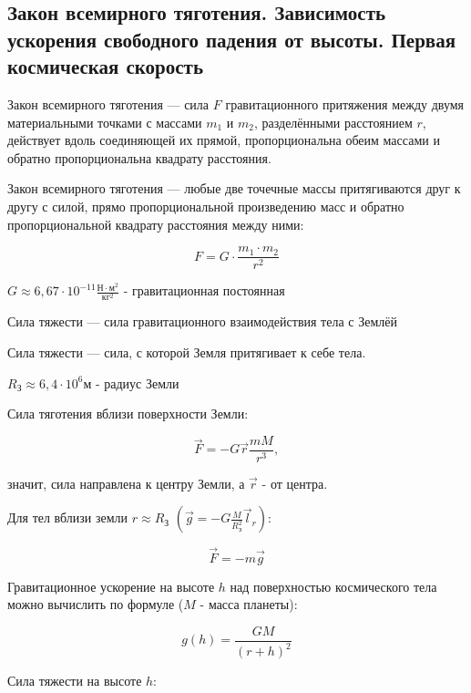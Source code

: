 \subsection{Закон всемирного тяготения. Зависимость ускорения свободного падения от высоты. Первая космическая скорость}

\begin{definition}
    Закон всемирного тяготения — сила $F$ гравитационного притяжения между двумя материальными точками с массами $m_1$ и $m_2$, 
    разделёнными расстоянием $r$, 
    действует вдоль соединяющей их прямой, пропорциональна обеим массами и обратно пропорциональна квадрату расстояния.
\end{definition}

Закон всемирного тяготения — любые две точечные массы притягиваются друг к другу с силой, прямо пропорциональной произведению масс 
и обратно пропорциональной квадрату расстояния между ними:

$$F=G\cdot\frac{m_1\cdot m_2}{r^2}$$

$G\approx 6,67\cdot 10^{-11} \frac{Н \cdot м^2}{кг^2}$ - гравитационная постоянная

\begin{definition}
     Сила тяжести  — сила гравитационного взаимодействия тела с Землёй

     Сила тяжести  — сила, с которой Земля притягивает к себе тела.
\end{definition}

\begin{remark}
    $R_З\approx 6,4\cdot 10^6 м$ - радиус Земли
\end{remark}

\begin{remark}
    Сила тяготения вблизи поверхности Земли:

\end{remark}

$$\vec F=-G\vec r\frac{mM}{r^3},$$

значит, сила направлена к центру Земли, а $\vec r$ - от центра.

Для тел вблизи земли $r\approx R_З$ $\displaystyle(\vec g=-G\frac{M}{R^2_З}\vec l_r)$:

$$\vec F=-m\vec g$$

Гравитационное ускорение на высоте $h$ над поверхностью космического тела можно вычислить по формуле ($M$ - масса планеты):

$$g(h)=\frac{GM}{(r+h)^2}$$

Сила тяжести на высоте $h$:

